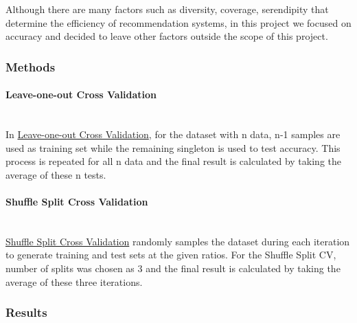 	Although there are many factors such as diversity, coverage, serendipity that determine the efficiency of recommendation systems, in this project we focused on accuracy and decided to leave other factors outside the scope of this project.
	\subsubsection{Methods}
	\paragraph{Leave-one-out Cross Validation} \mbox{} \\
	In 	 \href{https://surprise.readthedocs.io/en/stable/model_selection.html#surprise.model_selection.split.LeaveOneOut}{Leave-one-out Cross Validation}, for the dataset with n data, n-1 samples are used as training set while the remaining singleton is used to test accuracy. This process is repeated for all n data and the final result is calculated by taking the average of these n tests.
	
	\paragraph{Shuffle Split Cross Validation} \mbox{} \\
	 \href{https://surprise.readthedocs.io/en/stable/model_selection.html#surprise.model_selection.split.ShuffleSplit}{Shuffle Split Cross Validation} randomly samples the dataset during each iteration to generate training and test sets at the given ratios. For the Shuffle Split CV, number of splits was chosen as 3 and the final result is calculated by taking the average of these three iterations.
	
	\subsubsection{Results}
